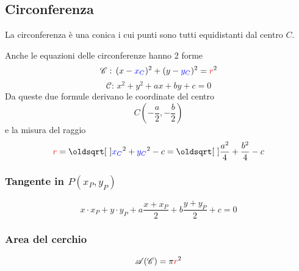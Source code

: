 \subsection{Circonferenza}\label{subsec:geomana:circ}
La circonferenza è una conica i cui punti sono tutti equidistanti dal centro $C$.
\begin{center}
\end{center}

Anche le equazioni delle circonferenze hanno 2 forme
\begin{equation*}
\mathscr{C}:\,(x-\mathcolor{blue}{x_C})^2 + (y-\mathcolor{blue}{y_C})^2 = \mathcolor{red}{r}^2
\end{equation*}
\begin{equation*}
\mathscr{C}:\,x^2+y^2+ax+by+c =0
\end{equation*}
Da queste due formule derivano le coordinate del centro
\begin{equation*}
C\left(-\frac{a}{2},-\frac{b}{2}\right)
\end{equation*}
e la misura del raggio
\begin{equation*}
\mathcolor{red}{r} = \sqrt{\mathcolor{blue}{x_C}^2+\mathcolor{blue}{y_C}^2-c} = 
\sqrt{\frac{a^2}{4}+\frac{b^2}{4}-c}
\end{equation*}

\subsubsection{Tangente in $P(x_P,y_P)$}
\begin{equation*}
x\cdot x_P+y\cdot y_P+a\frac{x+x_P}{2}+b\frac{y+y_P}{2}+c = 0
\end{equation*}

\subsubsection{Area del cerchio}
\begin{equation*}
\mathscr{A}(\mathscr{C}) = \pi\mathcolor{red}{r}^2
\end{equation*}

